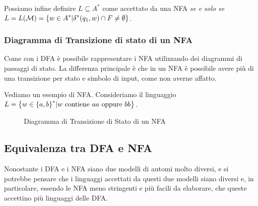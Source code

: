 Possiamo infine definire \(L\subseteq A^*\) come accettato da una NFA \textit{se e solo se} \(L=L(\mathcal{M}) = \displaystyle{\left\{{w \in A^* \vert \delta^*(q_1,w) \cap F \neq \emptyset}\right\}}\).

\subsubsection{Diagramma di Transizione di stato di un NFA}

Come con i DFA è possibile rappresentare i NFA utilizzando dei diagrammi di passaggi di stato. La differenza principale è che in un NFA è possibile avere più di una transizione per stato e simbolo di input, come non averne affatto.

Vediamo un esempio di NFA. Consideriamo il linguaggio \(L=\displaystyle{\left\{{w \in \displaystyle{\left\{{a,b}\right\}}^* \vert w \text{ contiene } aa \text{ oppure } bb}\right\}}\). %

\begin{figure}[ht]
  \centering
  \caption{Diagramma di Transizione di Stato di un NFA}\label{NFA Esempio}
\end{figure}

\subsection{Equivalenza tra DFA e NFA}

Nonostante i DFA e i NFA siano due modelli di automi molto diversi, e si potrebbe pensare che i linguaggi accettati da questi due modelli siano diversi e, in particolare, essendo le NFA meno stringenti e più facili da elaborare, che queste accettino più linguaggi delle DFA. %

